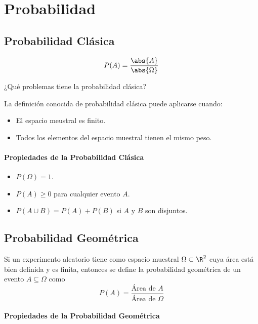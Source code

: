 \section{Probabilidad}
\subsection{Probabilidad Clásica}

\begin{equation}
	P(A) = \frac{\abs{A}}{\abs{\Omega}} \label{prob_clasica}
\end{equation}

¿Qué problemas tiene la probabilidad  clásica?

La definición conocida de probabilidad clásica puede aplicarse cuando:
\begin{itemize}
	\item El espacio meustral es finito.
	\item Todos los elementos del espacio muestral tienen el mismo peso.
\end{itemize}

\paragraph{Propiedades de la Probabilidad Clásica}

\begin{itemize}
	\item $P(\Omega) = 1$.
	\item $P(A) \geq 0$ para cualquier evento $A$.
	\item $P(A\cup B) = P(A) + P(B)$ si $A$ y $B$ son disjuntos.
\end{itemize}

\subsection{Probabilidad Geométrica}

Si un experimento aleatorio tiene como espacio muestral $\Omega \subset \R ^2$ cuya área está bien definida y es finita, entonces se define la probabilidad geométrica de un evento $A \subseteq \Omega$ como
\begin{equation}
	P(A) = \frac{\text{Área de } A}{\text{Área de } \Omega} \label{prob_geometrica}	
\end{equation}


\paragraph{Propiedades de la Probabilidad Geométrica}

